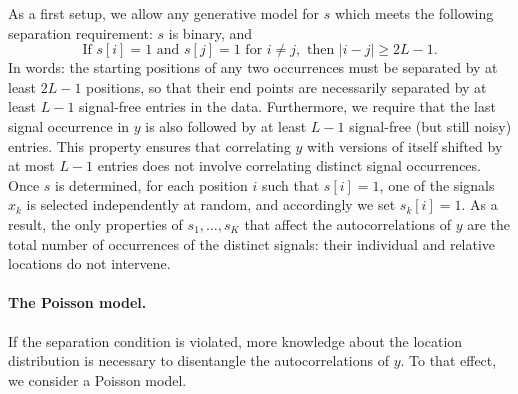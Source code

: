 \documentclass[12pt]{article}
\newcommand{\1}{\mathbf{1}}
\newcommand{\RL}{\mathbb{R}^L}
\theoremstyle{plain}
\theoremstyle{definition}
\theoremstyle{remark}
\theoremstyle{plain}
\theoremstyle{remark}
\theoremstyle{plain}
\theoremstyle{plain}
\theoremstyle{plain}
\numberwithin{equation}{section}
\begin{document}
As a first setup, we allow any generative model for $s$ which meets the following separation requirement: $s$ is binary, and
\begin{equation}
\textrm{If } s[i] = 1 \textrm{ and } s[j] = 1 \textrm{ for } i \neq j, \textrm{ then } |i - j| \geq 2L-1.
\label{eq:spacing}
\end{equation}
In words: the starting positions of any two occurrences  must be separated by at least $2L-1$ positions, so that their end points are necessarily separated by at least $L-1$ signal-free entries in the data.
Furthermore, we require that the last signal occurrence in $y$ is also followed by at least $L-1$ signal-free (but still noisy) entries.
This property ensures that correlating $y$ with versions of itself shifted by at most $L-1$ entries does not involve correlating distinct signal occurrences. Once $s$ is determined, for each position $i$ such that $s[i] = 1$, one of the signals $x_k$ is selected independently at random, and accordingly we set $s_k[i] = 1$. As a result, the only properties of $s_1, \ldots, s_K$ that affect the autocorrelations of $y$ are the total number of occurrences of the distinct signals: their individual and relative locations do not intervene.

\paragraph{The Poisson model.}

If the separation condition is violated, more knowledge about the location distribution is necessary to disentangle the autocorrelations of $y$. To that effect, we consider a Poisson model.

\end{document}
